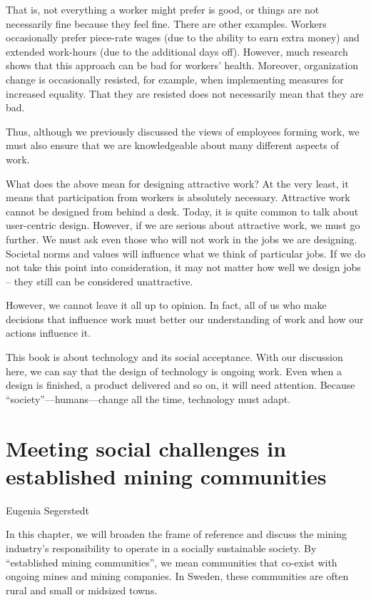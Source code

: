 \documentclass[
  12pt,
]{scrbook}
\newenvironment{chap-auth}
{\vspace{1cm}\begin{center}\begin{flushright}\sffamily\noindent}
  {\end{flushright}\end{center}\vspace{1cm}}
\begin{document}
That is, not everything a worker might prefer is good, or things are not necessarily fine because they feel fine. There are other examples. Workers occasionally prefer piece-rate wages (due to the ability to earn extra money) and extended work-hours (due to the additional days off). However, much research shows that this approach can be bad for workers' health. Moreover, organization change is occasionally resisted, for example, when implementing measures for increased equality. That they are resisted does not necessarily mean that they are bad.

Thus, although we previously discussed the views of employees forming work, we must also ensure that we are knowledgeable about many different aspects of work.

What does the above mean for designing attractive work? At the very least, it means that participation from workers is absolutely necessary. Attractive work cannot be designed from behind a desk. Today, it is quite common to talk about user-centric design. However, if we are serious about attractive work, we must go further. We must ask even those who will not work in the jobs we are designing. Societal norms and values will influence what we think of particular jobs. If we do not take this point into consideration, it may not matter how well we design jobs -- they still can be considered unattractive.

However, we cannot leave it all up to opinion. In fact, all of us who make decisions that influence work must better our understanding of work and how our actions influence it.

This book is about technology and its social acceptance. With our discussion here, we can say that the design of technology is ongoing work. Even when a design is finished, a product delivered and so on, it will need attention. Because ``society''---humans---change all the time, technology must adapt.

\hypertarget{meeting-social-challenges-in-established-mining-communities}{%
\chapter{Meeting social challenges in established mining communities}\label{meeting-social-challenges-in-established-mining-communities}}

\begin{chap-auth}
Eugenia Segerstedt
\end{chap-auth}

In this chapter, we will broaden the frame of reference and discuss the mining industry's responsibility to operate in a socially sustainable society. By ``established mining communities'', we mean communities that co-exist with ongoing mines and mining companies. In Sweden, these communities are often rural and small or midsized towns.
\end{document}
